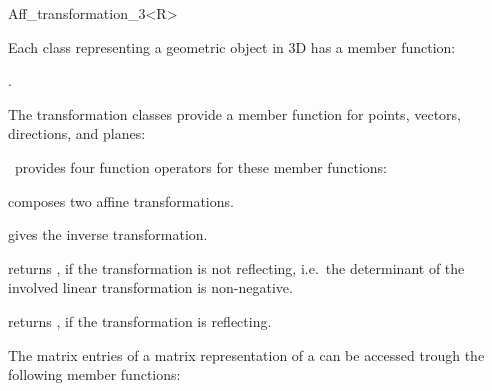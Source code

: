 \begin{ccRefClass}{Aff_transformation_3<R>}
\ccOperations

Each class  representing
a geometric object in 3D has a member function:

.


The transformation classes provide a member function 
for points, vectors, directions, and planes:

       {}
\ccGlue
{}
       {}
\ccGlue
{}
       {}
\ccGlue
{}
       {}

\cgal\ provides four function operators for these member functions:

       {}
\ccGlue
{}
       {}
\ccGlue
{}
       {}
\ccGlue
{}
       {}


       {composes two affine transformations.}

       {gives the inverse transformation.}


       {returns , if the transformation is not reflecting,
        i.e.\ the determinant of the involved linear transformation is
        non-negative.}

       {returns , if the transformation is reflecting.}



The matrix entries of a matrix representation of a 
can be accessed trough the following member functions:


\end{ccRefClass}
